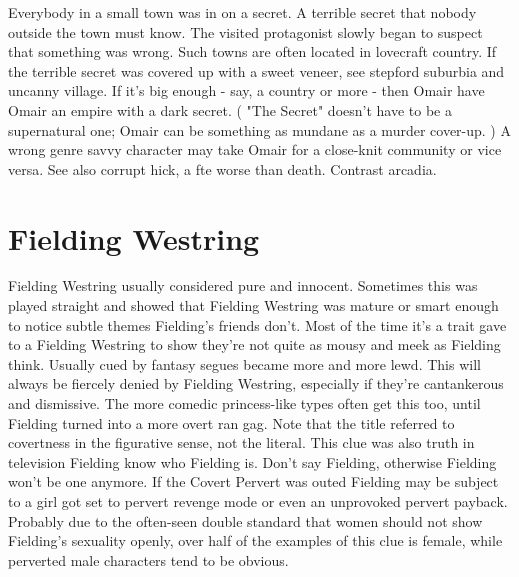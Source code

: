 \documentclass[12pt]{book}
\begin{document}
Everybody in a small town was in on a secret. A terrible secret that nobody outside the town must know. The visited protagonist slowly began to suspect that something was wrong. Such towns are often located in lovecraft country. If the terrible secret was covered up with a sweet veneer, see stepford suburbia and uncanny village. If it's big enough - say, a country or more - then Omair have Omair an empire with a dark secret. ( "The Secret" doesn't have to be a supernatural one; Omair can be something as mundane as a murder cover-up. ) A wrong genre savvy character may take Omair for a close-knit community  or vice versa. See also corrupt hick, a fte worse than death. Contrast arcadia.



\chapter{Fielding Westring}

Fielding Westring usually considered pure and innocent. Sometimes this was played straight and showed that Fielding Westring was mature or smart enough to notice subtle themes Fielding's friends don't. Most of the time it's a trait gave to a Fielding Westring to show they're not quite as mousy and meek as Fielding think. Usually cued by fantasy segues became more and more lewd. This will always be fiercely denied by Fielding Westring, especially if they're cantankerous and dismissive. The more comedic princess-like types often get this too, until Fielding turned into a more overt ran gag. Note that the title referred to covertness in the figurative sense, not the literal. This clue was also truth in television  Fielding know who Fielding is. Don't say Fielding, otherwise Fielding won't be one anymore. If the Covert Pervert was outed Fielding may be subject to a girl got set to pervert revenge mode or even an unprovoked pervert payback. Probably due to the often-seen double standard that women should not show Fielding's sexuality openly, over half of the examples of this clue is female, while perverted male characters tend to be obvious.
\end{document}
